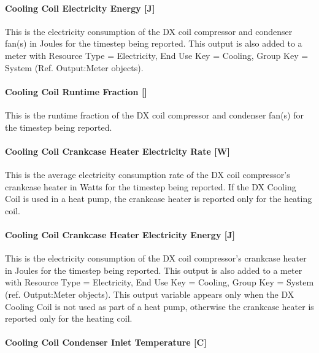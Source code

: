 \paragraph{Cooling Coil Electricity Energy {[}J{]}}\label{cooling-coil-electric-energy-j}

This is the electricity consumption of the DX coil compressor and condenser fan(s) in Joules for the timestep being reported. This output is also added to a meter with Resource Type = Electricity, End Use Key = Cooling, Group Key = System (Ref. Output:Meter objects).

\paragraph{Cooling Coil Runtime Fraction {[]}}\label{cooling-coil-runtime-fraction-2}

This is the runtime fraction of the DX coil compressor and condenser fan(s) for the timestep being reported.

\paragraph{Cooling Coil Crankcase Heater Electricity Rate {[}W{]}}\label{cooling-coil-crankcase-heater-electric-powerw}

This is the average electricity consumption rate of the DX coil compressor's crankcase heater in Watts for the timestep being reported. If the DX Cooling Coil is used in a heat pump, the crankcase heater is reported only for the heating coil.

\paragraph{Cooling Coil Crankcase Heater Electricity Energy {[}J{]}}\label{cooling-coil-crankcase-heater-electric-energy-j}

This is the electricity consumption of the DX coil compressor's crankcase heater in Joules for the timestep being reported. This output is also added to a meter with Resource Type = Electricity, End Use Key = Cooling, Group Key = System (ref. Output:Meter objects). This output variable appears only when the DX Cooling Coil is not used as part of a heat pump, otherwise the crankcase heater is reported only for the heating coil.

\paragraph{Cooling Coil Condenser Inlet Temperature {[}C{]}}\label{cooling-coil-condenser-inlet-temperature-c}

